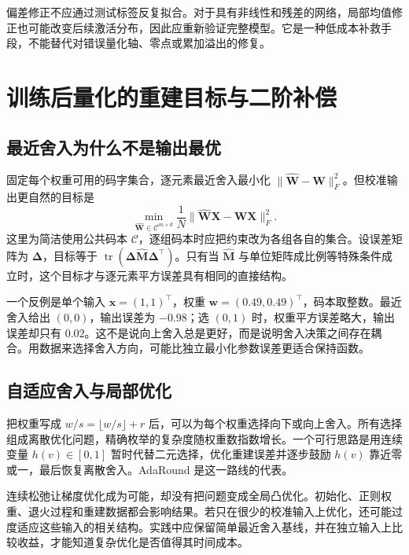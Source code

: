 \documentclass[UTF8,12pt,a4paper,fontset=fandol]{ctexart}
\begin{document}
偏差修正不应通过测试标签反复拟合。对于具有非线性和残差的网络，局部均值修正也可能改变后续激活分布，因此应重新验证完整模型。它是一种低成本补救手段，不能替代对错误量化轴、零点或累加溢出的修复。

\section{训练后量化的重建目标与二阶补偿}
\label{sec:quant-ptq}

\subsection{最近舍入为什么不是输出最优}
固定每个权重可用的码字集合，逐元素最近舍入最小化 $\|\widehat{\mathbf W}-\mathbf W\|_F^2$。但校准输出更自然的目标是
\begin{equation}
 \min_{\widehat{\mathbf W}\in\mathcal C^{m\times d}}
 \frac1N\|\widehat{\mathbf W}\mathbf X-\mathbf W\mathbf X\|_F^2.
 \label{eq:quant-layer-reconstruction}
\end{equation}
这里为简洁使用公共码本 $\mathcal C$，逐组码本时应把约束改为各组各自的集合。设误差矩阵为 $\boldsymbol\Delta$，目标等于 $\operatorname{tr}(\boldsymbol\Delta\widehat{\mathbf M}\boldsymbol\Delta^\top)$。只有当 $\widehat{\mathbf M}$ 与单位矩阵成比例等特殊条件成立时，这个目标才与逐元素平方误差具有相同的直接结构。

一个反例是单个输入 $\mathbf x=(1,1)^\top$，权重 $\mathbf w=(0.49,0.49)^\top$，码本取整数。最近舍入给出 $(0,0)$，输出误差为 $-0.98$；选 $(0,1)$ 时，权重平方误差略大，输出误差却只有 $0.02$。这不是说向上舍入总是更好，而是说明舍入决策之间存在耦合。用数据来选择舍入方向，可能比独立最小化参数误差更适合保持函数。

\subsection{自适应舍入与局部优化}
把权重写成 $w/s=\lfloor w/s\rfloor+r$ 后，可以为每个权重选择向下或向上舍入。所有选择组成离散优化问题，精确枚举的复杂度随权重数指数增长。一个可行思路是用连续变量 $h(v)\in[0,1]$ 暂时代替二元选择，优化重建误差并逐步鼓励 $h(v)$ 靠近零或一，最后恢复离散舍入。AdaRound 是这一路线的代表\cite{nagel2020}。

连续松弛让梯度优化成为可能，却没有把问题变成全局凸优化。初始化、正则权重、退火过程和重建数据都会影响结果。若只在很少的校准输入上优化，还可能过度适应这些输入的相关结构。实践中应保留简单最近舍入基线，并在独立输入上比较收益，才能知道复杂优化是否值得其时间成本。
\end{document}
